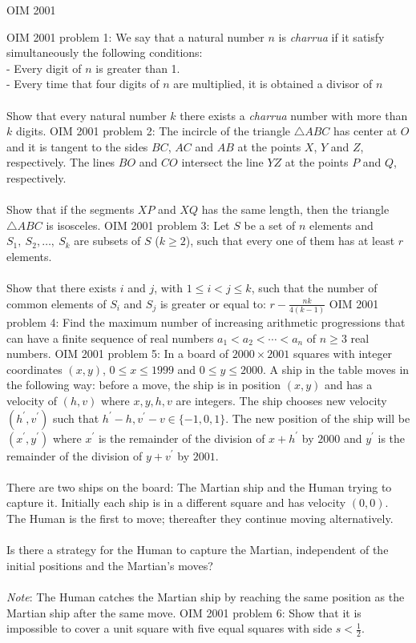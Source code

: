 OIM 2001 

OIM 2001 problem 1:  We say that a natural number $n$ is \textit{charrua} if it satisfy simultaneously the following conditions: \\
- Every digit of $n$ is greater than 1. \\
- Every time that four digits of $n$ are multiplied, it is obtained a divisor of $n$ \\\\
Show that every natural number $k$ there exists a \textit{charrua} number with more than $k$ digits. 
OIM 2001 problem 2:  The incircle of the triangle $\triangle{ABC}$ has center at $O$ and it is tangent to the sides $BC$, $AC$ and $AB$ at the points $X$, $Y$ and $Z$, respectively. The lines $BO$ and $CO$ intersect the line $YZ$ at the points $P$ and $Q$, respectively. \\\\
Show that if the segments $XP$ and $XQ$ has the same length, then the triangle $\triangle ABC$ is isosceles. 
OIM 2001 problem 3:  Let $S$ be a set of $n$ elements and $S_1,\ S_2,\dots,\ S_k$ are subsets of $S$ ($k\geq2$), such that every one of them has at least $r$ elements. \\\\
Show that there exists $i$ and $j$, with $1\leq{i}<j\leq{k}$, such that the number of common elements of $S_i$ and $S_j$ is greater or equal to: $r-\frac{nk}{4(k-1)}$ 
OIM 2001 problem 4:  Find the maximum number of increasing arithmetic progressions that can have a finite sequence of real numbers $a_1<a_2<\cdots<a_n$ of $n\ge 3$ real numbers. 
OIM 2001 problem 5:  In a board of $2000\times2001$ squares with integer coordinates $(x,y)$, $0\leq{x}\leq1999$ and $0\leq{y}\leq2000$. A ship in the table moves in the following way: before a move, the ship is in position $(x,y)$ and has a velocity of $(h,v)$ where $x,y,h,v$ are integers. The ship chooses new velocity $(h^\prime,v^\prime)$ such that $h^\prime-h,v^\prime-v\in\{-1,0,1\}$. The new position of the ship will be $(x^\prime,y^\prime)$ where $x^\prime$ is the remainder of the division of $x+h^\prime$ by $2000$ and $y^\prime$ is the remainder of the division of $y+v^\prime$ by $2001$. \\\\
There are two ships on the board: The Martian ship and the Human trying to capture it. Initially each ship is in a different square and has velocity $(0,0)$. The Human is the first to move; thereafter they continue moving alternatively. \\\\
Is there a strategy for the Human to capture the Martian, independent of the initial positions and the Martian’s moves? \\\\
\textit{Note}: The Human catches the Martian ship by reaching the same position as the Martian ship after the same move. 
OIM 2001 problem 6:  Show that it is impossible to cover a unit square with five equal squares with side $s<\frac{1}{2}$. 

